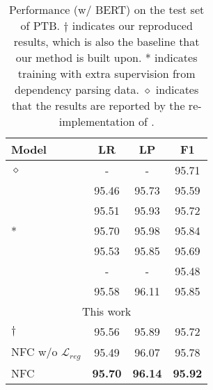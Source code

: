 \documentclass[11pt]{article}
\begin{document}
\begin{table}[!t]
\centering
    \begin{adjustbox}{max width=1.0\columnwidth}
    \begin{tabular}{lccc}
\hline
        {\bf Model} & {\bf LR} & {\bf LP} & {\bf F1} \\
        \hline
        \citet{liu-zhang-2017-order} $\diamond$ & - & - & 95.71 \\
        \citet{san-constituency} & 95.46 & 95.73 & 95.59 \\
        \citet{head-driven} & 95.51 & 95.93 & 95.72 \\
        \citet{head-driven} * & 95.70 & 95.98 & 95.84 \\
        \citet{constituency-crf} & 95.53 & 95.85 & 95.69 \\
        \citet{constituency-point} & - & - & 95.48 \\
\citet{span-attention} & 95.58 & 96.11 & 95.85 \\
        \hline
        \multicolumn{4}{c}{This work} \\
        \hline
        \citet{san-constituency} $\dagger$ & 95.56 & 95.89 & 95.72 \\
NFC w/o $\mathcal{L}_{reg}$ & 95.49 & 96.07 & 95.78 \\
NFC & {\bf 95.70} & {\bf 96.14} & {\bf 95.92} \\
        \hline
    \end{tabular}
    \end{adjustbox}
    \caption{Performance (w/ BERT) on the test set of PTB. $\dagger$ indicates our reproduced results, which is also the baseline that our method is built upon. * indicates training with extra supervision from dependency parsing data. $\diamond$ indicates that the results are reported by the re-implementation of \citet{cross-domain-parser}. }
    \label{tab:ptb}
\end{table}
\end{document}
